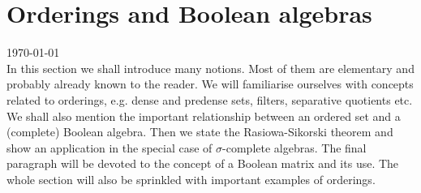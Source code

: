 \cfoot{}\rhead{\thepage}

%


\thispagestyle{empty}

\section{Orderings and Boolean algebras}

{\tiny \today } \\[0.5cm]

In this section we shall introduce many notions.
Most of them are elementary and probably already known to the reader.
We will familiarise ourselves with concepts related
to orderings, e.g. dense and predense sets, filters, separative quotients etc.
We shall also mention the important relationship between
an ordered set and a (complete) Boolean algebra. Then we state the
Rasiowa-Sikorski theorem and show an application in
the special case of $\sigma$-complete algebras. The final paragraph will be devoted
to the concept of a Boolean matrix and its use.
The whole section will also be sprinkled with important
examples of orderings.

%


